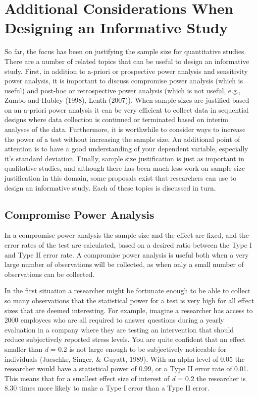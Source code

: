 \documentclass[
  english,
  ,jou,floatsintext]{apa6}
\begin{document}
\hypertarget{additional-considerations-when-designing-an-informative-study}{%
\section{Additional Considerations When Designing an Informative Study}\label{additional-considerations-when-designing-an-informative-study}}

So far, the focus has been on justifying the sample size for quantitative studies. There are a number of related topics that can be useful to design an informative study. First, in addition to a-priori or prospective power analysis and sensitivity power analysis, it is important to discuss compromise power analysis (which is useful) and post-hoc or retrospective power analysis (which is not useful, e.g., Zumbo and Hubley (1998), Lenth (2007)). When sample sizes are justified based on an a-priori power analysis it can be very efficient to collect data in sequential designs where data collection is continued or terminated based on interim analyses of the data. Furthermore, it is worthwhile to consider ways to increase the power of a test without increasing the sample size. An additional point of attention is to have a good understanding of your dependent variable, especially it's standard deviation. Finally, sample size justification is just as important in qualitative studies, and although there has been much less work on sample size justification in this domain, some proposals exist that researchers can use to design an informative study. Each of these topics is discussed in turn.

\hypertarget{compromise-power-analysis}{%
\subsection{Compromise Power Analysis}\label{compromise-power-analysis}}

In a compromise power analysis the sample size and the effect are fixed, and the error rates of the test are calculated, based on a desired ratio between the Type I and Type II error rate. A compromise power analysis is useful both when a very large number of observations will be collected, as when only a small number of observations can be collected.

In the first situation a researcher might be fortunate enough to be able to collect so many observations that the statistical power for a test is very high for all effect sizes that are deemed interesting. For example, imagine a researcher has access to 2000 employees who are all required to answer questions during a yearly evaluation in a company where they are testing an intervention that should reduce subjectively reported stress levels. You are quite confident that an effect smaller than \emph{d} = 0.2 is not large enough to be subjectively noticeable for individuals (Jaeschke, Singer, \& Guyatt, 1989). With an alpha level of 0.05 the researcher would have a statistical power of 0.99, or a Type II error rate of 0.01. This means that for a smallest effect size of interest of \emph{d} = 0.2 the researcher is 8.30 times more likely to make a Type I error than a Type II error.
\end{document}
